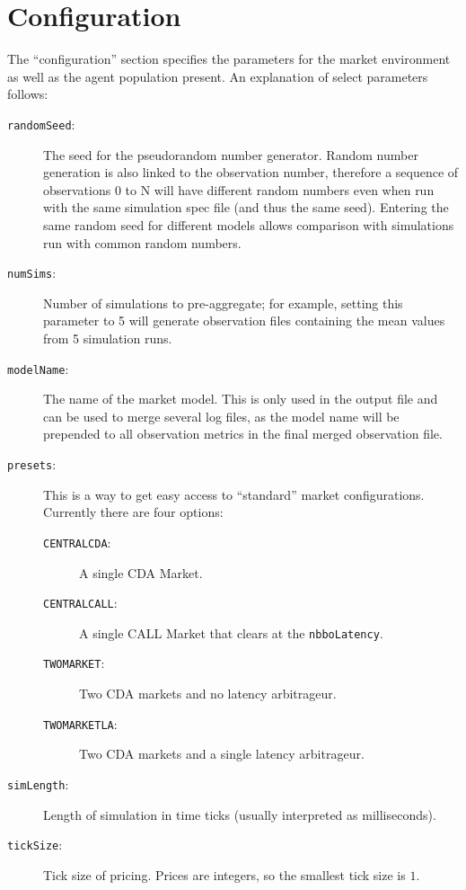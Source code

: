 \documentclass[11pt]{article}
\begin{document}
\section{Configuration}

The ``configuration'' section specifies the parameters for the market environment as well as the agent population present.
%
An explanation of select parameters follows:
\begin{description}
\item[\texttt{randomSeed}:] The seed for the pseudorandom number generator. Random number generation is also linked to the observation number, therefore a sequence of observations 0 to N will have different random numbers even when run with the same simulation spec file (and thus the same seed). Entering the same random seed for different models allows comparison with simulations run with common random numbers.

\item[\texttt{numSims}:] Number of simulations to pre-aggregate; for example, setting this parameter to 5 will generate observation files containing the mean values from 5 simulation runs.
\item[\texttt{modelName}:] The name of the market model. This is only used in the
  output file and can be used to merge several log files, as the model name will be prepended to all observation metrics in the final merged observation file.

\item[\texttt{presets}:] This is a way to get easy access to ``standard'' market
  configurations. Currently there are four options:
  \begin{description}
  \item[\texttt{CENTRALCDA}:] A single CDA Market.
  \item[\texttt{CENTRALCALL}:] A single CALL Market that clears at the \texttt{nbboLatency}.
  \item[\texttt{TWOMARKET}:] Two CDA markets and no latency arbitrageur.
  \item[\texttt{TWOMARKETLA}:] Two CDA markets and a single latency arbitrageur.
  \end{description}

  \item[\texttt{simLength}:] Length of simulation in time ticks (usually interpreted as milliseconds).

  \item[\texttt{tickSize}:] Tick size of pricing. Prices are integers, so the
  smallest tick size is $1$.


\end{description}
\end{document}
